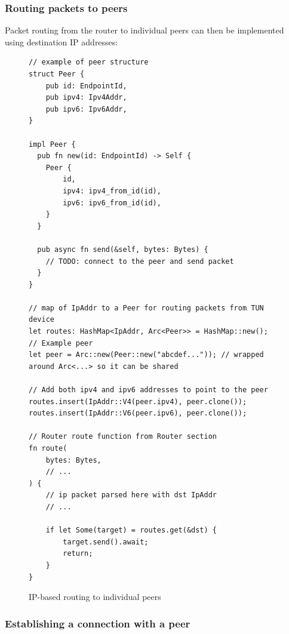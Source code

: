 \documentclass[a4paper, 10pt]{article}
\begin{document}
\newpage

\subsubsection{Routing packets to peers}

Packet routing from the router to individual peers can then be implemented using destination IP addresses:
\begin{figure}[H]
  \begin{verbatim}
// example of peer structure
struct Peer {
    pub id: EndpointId,
    pub ipv4: Ipv4Addr,
    pub ipv6: Ipv6Addr,
}

impl Peer {
  pub fn new(id: EndpointId) -> Self {
    Peer {
        id,
        ipv4: ipv4_from_id(id),
        ipv6: ipv6_from_id(id),
    }
  }

  pub async fn send(&self, bytes: Bytes) {
    // TODO: connect to the peer and send packet
  }
}

// map of IpAddr to a Peer for routing packets from TUN device
let routes: HashMap<IpAddr, Arc<Peer>> = HashMap::new();
// Example peer
let peer = Arc::new(Peer::new("abcdef...")); // wrapped around Arc<...> so it can be shared

// Add both ipv4 and ipv6 addresses to point to the peer
routes.insert(IpAddr::V4(peer.ipv4), peer.clone());
routes.insert(IpAddr::V6(peer.ipv6), peer.clone());

// Router route function from Router section
fn route(
    bytes: Bytes,
    // ...
) {
    // ip packet parsed here with dst IpAddr
    // ...

    if let Some(target) = routes.get(&dst) {
        target.send().await;
        return;
    }
}
  \end{verbatim}
  \caption{IP-based routing to individual peers}
\end{figure}

\newpage

\subsubsection{Establishing a connection with a peer}
\end{document}
